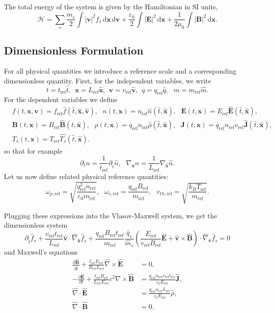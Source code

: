 \documentclass[english]{article}
\newcommand{\bx}{\textbf{x}}
\newcommand{\bv}{\textbf{v}}
\newcommand{\bB}{\textbf{B}}
\newcommand{\bE}{\textbf{E}}
\newcommand{\bJ}{\textbf{J}}
\newcommand{\du}{\,\mathrm{d}}
\newcommand{\tr}{t_{\mathrm{ref}}}
\newcommand{\xr}{L_{\mathrm{ref}}}
\newcommand{\nr}{n_{\mathrm{ref}}}
\newcommand{\fr}{f_{\mathrm{ref}}}
\newcommand{\qr}{q_{\mathrm{ref}}}
\newcommand{\Tr}{T_{\mathrm{ref}}}
\newcommand{\mr}{m_{\mathrm{ref}}}
\newcommand{\Br}{B_{\mathrm{ref}}}
\newcommand{\Er}{E_{\mathrm{ref}}}
\newcommand{\vr}{v_{\mathrm{ref}}}
\newcommand{\vthr}{v_{th,\mathrm{ref}}}
\newcommand{\ompr}{\omega_{p,\mathrm{ref}}}
\newcommand{\omcr}{\omega_{c,\mathrm{ref}}}
\newcommand{\nablaht}{\hat{\nabla}}
\newcommand{\nablaxht}{\hat{\nabla}_{\xht}}
\newcommand{\nablavht}{\hat{\nabla}_{\vht}}
\newcommand{\tht}{\hat{t}}
\newcommand{\xht}{\hat{\bx}}
\newcommand{\vht}{\hat{\bv}}
\newcommand{\qht}{\hat{q}}
\newcommand{\mht}{\hat{m}}
\newcommand{\Eht}{\hat{\bE}}
\newcommand{\Bht}{\hat{\bB}}
\newcommand{\Jht}{\hat{\bJ}}
\newcommand{\rhoht}{\hat{\rho}}
\newcommand{\nht}{\hat{n}}
\newcommand{\Tsht}{\hat{T_{s}}}
\newcommand{\fht}{\hat{f}}
\begin{document}
The total energy of the system is given by the Hamiltonian in SI units, 
\begin{equation}\label{eq:hamiltonian}
\mathcal{H}=\sum_s\frac{m_s}{2}\int |\bv|^2 f_s \du\bx \du\bv + \frac{\varepsilon_0}{2} \int |\bE|^2 \du\bx + \frac{1}{2\mu_0} \int |\bB|^2 \du\bx.
\end{equation}



\subsection{Dimensionless Formulation}

For all physical quantities we introduce a reference scale and a corresponding dimensionless quantity.
First, for the independent variables, we write
$$t= \tr \tht, ~~ \bx= \xr \xht, ~~ \bv = \vr \vht, ~~ q = \qr\qht, ~~~ m = \mr\mht.$$
For the dependent variables we define 
\begin{align*}
	&f(t,\bx,\bv) = \fr \fht(\tht, \xht, \vht),~~~
	n(t,\bx) = \nr \nht(\tht, \xht), ~~~
	\bE(t,\bx) = \Er \Eht(\tht, \xht), \\
	&\bB(t,\bx) = \Br \Bht(\tht, \xht), ~~~
	\rho(t,\bx) = \qr\nr \rhoht(\tht, \xht), ~~~
	\bJ(t,\bx) = \qr\nr\vr \Jht(\tht, \xht), \\
	&T_s(t,\bx) = \Tr\Tsht(\tht, \xht).
\end{align*} 
so that for example 
$$\partial_t n = \frac{1}{\tr}\partial_{\tht} \nht, ~~~ \nabla_\bx n =  \frac{1}{\xr}\nabla_\xht \nht.$$
Let us now define related physical reference quantities:
\begin{equation}
	\ompr =\sqrt{\frac{\qr^2\nr}{\varepsilon_0\mr} }, ~~~ \omcr=\frac{\qr\Br}{\mr}, ~~~ \vthr = \sqrt{\frac{k_B \Tr}{\mr}}.
\end{equation}

Plugging these expressions into the Vlasov-Maxwell system, we get the dimensionless system
\begin{equation}\label{eq:Vlasovtr}
	\partial_{\tht} \fht_s + \frac{\vr\tr}{\xr}\vht \cdot \nablaxht \fht_s + \frac{\qr\Br\tr}{\mr} \frac{\qht_s}{\mht_s} \left( \frac{\Er}{\vr\Br}\Eht + \vht \times \Bht \right) \cdot \nablavht \fht_s = 0
	\end{equation}
	and Maxwell's equations
	\begin{subequations}
	\begin{align}
	\frac{\partial \Bht}{\partial \tht} + \frac{\tr \Er}{\Br\xr}\nablaht \times \Eht &= 0 , \\
	-  \frac{\partial \Eht}{\partial t} + \frac{\tr\Br}{\xr\Er} c^2\nabla \times \Bht &= \frac{\qr\nr\vr\tr}{\varepsilon_0\Er}\Jht , \\
	\nablaht \cdot \Eht &= \frac{\qr\nr\xr}{\varepsilon_0\Er}\rhoht,\\
	\nablaht \cdot \Bht &= 0.
	\end{align}
	\end{subequations}
\end{document}
